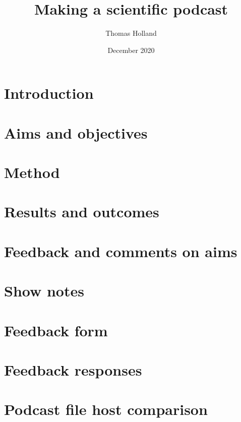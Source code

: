 \documentclass[a4paper, twoside]{report}
\title{Making a scientific podcast}
\author{Thomas Holland}
\date{December 2020}
\begin{document}
\begin{titlepage}
	\maketitle
\end{titlepage}
\restoregeometry
\tableofcontents

\chapter{Introduction}


\chapter{Aims and objectives}


\chapter{Method}


\chapter{Results and outcomes}


\chapter{Feedback and comments on aims}



\appendix

\chapter{Show notes}


\chapter{Feedback form}


\chapter{Feedback responses}


\chapter{Podcast file host comparison}




\end{document}

